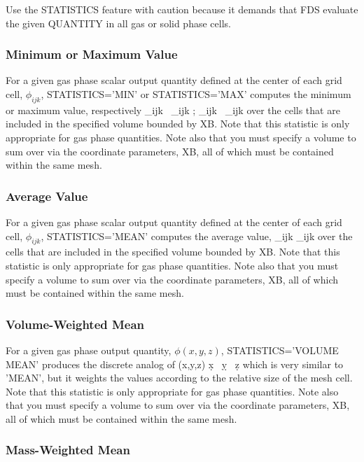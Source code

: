 \documentclass[11pt]{book}
\begin{document}
Use the {\ct STATISTICS} feature with caution because it demands that FDS evaluate the given {\ct QUANTITY} in all gas or solid phase cells.


\subsubsection{Minimum or Maximum Value}

For a given gas phase scalar output quantity defined at the center of each grid cell, $\phi_{ijk}$, {\ct STATISTICS='MIN'} or {\ct STATISTICS='MAX'}
computes the minimum or maximum value, respectively
\be \min_{ijk} \, \phi_{ijk} \quad ; \quad  \max_{ijk} \, \phi_{ijk} \ee
over the cells that are included in the specified volume bounded by {\ct XB}. Note that this
statistic is only appropriate for gas phase quantities. Note also that you must specify a volume to sum over via the
coordinate parameters, {\ct XB}, all of which must be contained within the same mesh.


\subsubsection{Average Value}

For a given gas phase scalar output quantity defined at the center of each grid cell, $\phi_{ijk}$, {\ct STATISTICS='MEAN'} computes the average value,
\be {} \; \sum_{ijk} \phi_{ijk}  \ee
over the cells that are included in the specified volume bounded by {\ct XB}. Note that this
statistic is only appropriate for gas phase quantities. Note also that you must specify a volume to sum over via the
coordinate parameters, {\ct XB}, all of which must be contained within the same mesh.

\subsubsection{Volume-Weighted Mean}

For a given gas phase output quantity, $\phi(x,y,z)$, {\ct STATISTICS='VOLUME MEAN'} produces the discrete analog of
\be {} \; \int \phi(x,y,z) \; \d x \, \d y \, \d z \ee
which is very similar to {\ct 'MEAN'}, but it weights the values according to the relative size of the mesh cell. Note that this
statistic is only appropriate for gas phase quantities. Note also that you must specify a volume to sum over via the
coordinate parameters, {\ct XB}, all of which must be contained within the same mesh.

\subsubsection{Mass-Weighted Mean}
\end{document}
